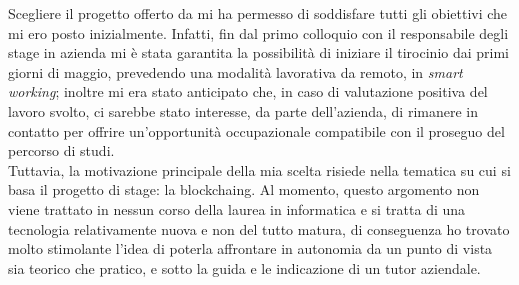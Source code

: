 Scegliere il progetto offerto da \myCompany{} \companyTitle{} mi ha permesso di soddisfare tutti gli obiettivi che mi ero posto inizialmente. Infatti, fin dal primo colloquio con il responsabile degli stage in azienda mi è stata garantita la possibilità di iniziare il tirocinio dai primi giorni di maggio, prevedendo una modalità lavorativa da remoto, in \textit{smart working}; inoltre mi era stato anticipato che, in caso di valutazione positiva del lavoro svolto, ci sarebbe stato interesse, da parte dell'azienda, di rimanere in contatto per offrire un'opportunità occupazionale compatibile con il 
proseguo del percorso di studi.\\
Tuttavia, la motivazione principale della mia scelta risiede nella tematica su cui si basa il progetto di stage: la \gls{blockchaing}. Al momento, questo argomento non viene trattato in nessun corso della laurea in informatica e si tratta di una tecnologia relativamente nuova e non del tutto matura, di conseguenza ho trovato molto stimolante l'idea di poterla affrontare in autonomia da un punto di vista sia teorico che pratico, e sotto la guida e le indicazione di un tutor aziendale.

